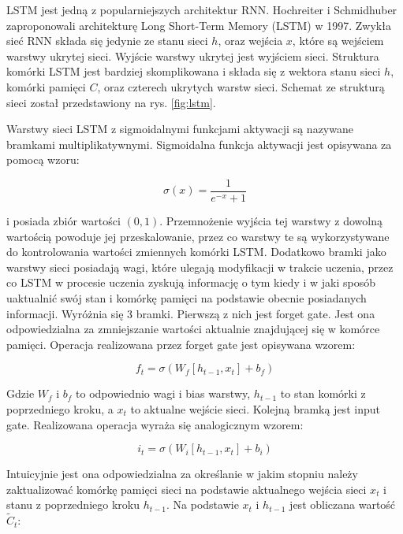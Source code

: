 \documentclass[oneside, mag]{mgr}
\begin{document}
LSTM jest jedną z popularniejszych architektur RNN. Hochreiter i Schmidhuber zaproponowali architekturę Long Short-Term Memory (LSTM) \cite{LSTM} w 1997. Zwykła sieć RNN składa się jedynie ze stanu sieci $h$, oraz wejścia $x$, które są wejściem warstwy ukrytej sieci. Wyjście warstwy ukrytej jest wyjściem sieci. Struktura komórki LSTM jest bardziej skomplikowana i składa się z wektora stanu sieci $h$, komórki pamięci $C$, oraz czterech ukrytych warstw sieci. Schemat ze strukturą sieci został przedstawiony na rys. \ref{fig:lstm}.

Warstwy sieci LSTM z sigmoidalnymi funkcjami aktywacji są nazywane bramkami multiplikatywnymi. Sigmoidalna funkcja aktywacji jest opisywana za pomocą wzoru:

\begin{equation}
	\sigma(x) = \frac{1}{e^{-x} + 1}
\end{equation}

i posiada zbiór wartości $(0, 1)$. Przemnożenie wyjścia tej warstwy z dowolną wartością powoduje jej przeskalowanie, przez co warstwy te są wykorzystywane do kontrolowania wartości zmiennych komórki LSTM. Dodatkowo bramki jako warstwy sieci posiadają wagi, które ulegają modyfikacji w trakcie uczenia, przez co LSTM w procesie uczenia zyskują informację o tym kiedy i w jaki sposób uaktualnić swój stan i komórkę pamięci na podstawie obecnie posiadanych informacji. Wyróżnia się 3 bramki. Pierwszą z nich jest forget gate. Jest ona odpowiedzialna za zmniejszanie wartości aktualnie znajdującej się w komórce pamięci. Operacja realizowana przez forget gate jest opisywana wzorem: 

\begin{equation}
	f_t = \sigma( W_f [ h_{t-1}, x_t ] + b_f )
\end{equation}

Gdzie $W_f$ i $b_f$ to odpowiednio wagi i bias warstwy, $h_{t-1}$ to stan komórki z poprzedniego kroku, a $x_t$ to aktualne wejście sieci. Kolejną bramką jest input gate. Realizowana operacja wyraża się analogicznym wzorem:

\begin{equation}
	i_t = \sigma( W_i [ h_{t-1}, x_t ] + b_i )
\end{equation}

Intuicyjnie jest ona odpowiedzialna za określanie w jakim stopniu należy zaktualizować komórkę pamięci sieci na podstawie aktualnego wejścia sieci $x_t$ i stanu z poprzedniego kroku $h_{t-1}$. Na podstawie $x_t$ i $h_{t-1}$ jest obliczana wartość $\tilde{C}_t$:
\end{document}
